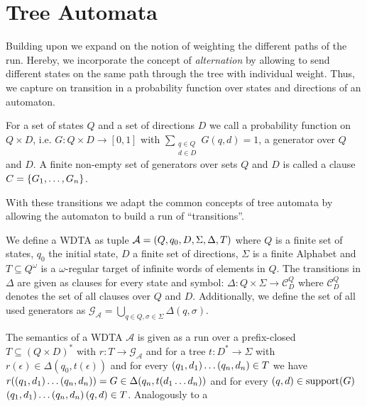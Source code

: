 \section{Tree Automata}
Building upon \cite{RandAutoInfTrees} we expand on the notion of weighting
the different paths of the run. Hereby, we incorporate the concept of
\emph{alternation} by allowing to send different states on the same path
through the tree with individual weight. Thus, we capture on transition in a
probability function over states and directions of an automaton.
\begin{definition}[Generator]
  For a set of states $Q$ and a set of directions $D$ we call a probability
  function on $Q\times D$, i.e. $G: Q\times D\rightarrow [0,1]$ with
  $\sum\limits_{\substack{q\in Q\\ d\in D}}G(q,d) = 1$, a generator over $Q$
  and $D$. A finite non-empty set of generators over sets $Q$ and $D$ is called
  a clause $C = \left\{G_{1},\dots,G_{n}\right\}$.
\end{definition}
With these transitions we adapt the common concepts of tree automata by
allowing the automaton to build a run of \enquote{transitions}.
\begin{definition}
  We define a \acl{WDTA} as tuple
  $\mathcal{A} = \left(Q, q_{0}, D, \Sigma, \Delta, T\right)$ where $Q$ is a finite
  set of states, $q_{0}$ the initial state, $D$ a finite set of directions,
  $\Sigma$ is a finite Alphabet and $T\subseteq Q^{\omega}$ is a
  $\omega$-regular target of infinite words of elements in $Q$. The transitions
  in $\Delta$ are given as clauses for every state and symbol:
  $\Delta:Q\times\Sigma\rightarrow\mathcal{C}^{Q}_{D}$
  where $\mathcal{C}^{Q}_{D}$ denotes the set of all clauses over $Q$ and $D$.
  Additionally, we define the set of all used generators as
  $\mathcal{G}_{\mathcal{A}} = \bigcup\limits_{q\in Q,\sigma\in\Sigma}
    \Delta(q,\sigma)$.
\end{definition}
The semantics of a \ac{WDTA} $\mathcal{A}$ is given as a run over a
prefix-closed $T\subseteq(Q\times D)^{*}$ with
$r:T\rightarrow \mathcal{G}_{\mathcal{A}}$ and for a tree
$t:D^{*}\rightarrow\Sigma$ with $r(\epsilon)\in\Delta(q_0, t(\epsilon))$ and
for every $\left(q_{1},d_{1}\right)\dots\left(q_{n},d_{n}\right)\in T$ we
have $r(\left(q_{1},d_{1}\right)\dots\left(q_{n},d_{n}\right)) = G\in
  \Delta(q_{n},t(d_{1}\dots d_{n}))$ and for every $\left(q,d\right)\in\operatorname{support}(G)$
$\left(q_{1},d_{1}\right)\dots\left(q_{n},d_{n}\right)\left(q,d\right)\in T$. Analogously to a
